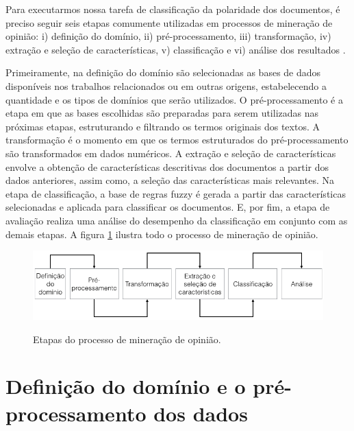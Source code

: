 \documentclass[template.tex]{subfiles}
\begin{document}

Para executarmos nossa tarefa de classificação da polaridade dos documentos, é preciso seguir seis etapas comumente utilizadas em processos de mineração de opinião: i) definição do domínio, ii) pré-processamento, iii) transformação, iv) extração e seleção de características, v) classificação e vi) análise dos resultados \cite{moraes2012document}.

Primeiramente, na definição do domínio são selecionadas as bases de dados disponíveis nos trabalhos relacionados ou em outras origens, estabelecendo a quantidade e os tipos de domínios que serão utilizados. O pré-processamento é a etapa em que as bases escolhidas são preparadas para serem utilizadas nas próximas etapas, estruturando e filtrando os termos originais dos textos. A transformação é o momento em que os termos estruturados do pré-processamento são transformados em dados numéricos. A extração e seleção de características envolve a obtenção de características descritivas dos documentos a partir dos dados anteriores, assim como, a seleção das características mais relevantes. Na etapa de classificação, a base de regras fuzzy é gerada a partir das características selecionadas e aplicada para classificar os documentos. E, por fim, a etapa de avaliação realiza uma análise do desempenho da classificação em conjunto com as demais etapas. A figura \ref{figura:processo_mineracao} ilustra todo o processo de mineração de opinião.

\begin{figure}[h]
\caption{Etapas do processo de mineração de opinião.}
\centering
\includegraphics[scale=0.55]{opinion_mining_process_2.png}
\label{figura:processo_mineracao}
\end{figure}

\section{Definição do domínio e o pré-processamento dos dados}
\end{document}
